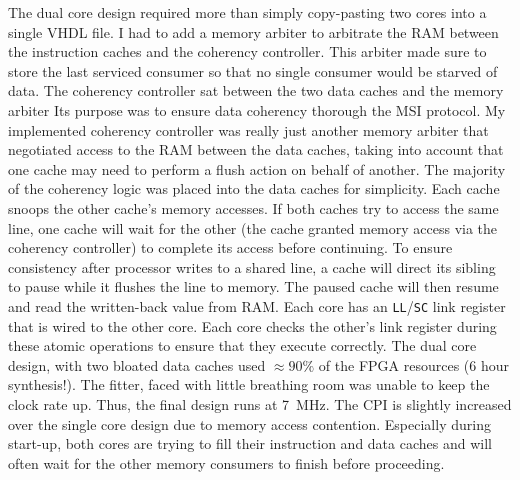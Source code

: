 \documentclass[12pt]{article}
\begin{document}
The dual core design required more than simply copy-pasting two cores into a single VHDL file. I had to add a memory arbiter to arbitrate the RAM between the instruction caches and the coherency controller. This arbiter made sure to store the last serviced consumer so that no single consumer would be starved of data. The coherency controller sat between the two data caches and the memory arbiter Its purpose was to ensure data coherency thorough the MSI protocol. My implemented coherency controller was really just another memory arbiter that negotiated access to the RAM between the data caches, taking into account that one cache may need to perform a flush action on behalf of another. The majority of the coherency logic was placed into the data caches for simplicity. Each cache snoops the other cache's memory accesses. If both caches try to access the same line, one cache will wait for the other (the cache granted memory access via the coherency controller) to complete its access before continuing. To ensure consistency after processor writes to a shared line, a cache will direct its sibling to pause while it flushes the line to memory. The paused cache will then resume and read the written-back value from RAM. Each core has an \texttt{LL}/\texttt{SC} link register that is wired to the other core. Each core checks the other's link register during these atomic operations to ensure that they execute correctly. The dual core design, with two bloated data caches used $\approx 90\%$ of the FPGA resources (6 hour synthesis!). The fitter, faced with little breathing room was unable to keep the clock rate up. Thus, the final design runs at 7~MHz. The CPI is slightly increased over the single core design due to memory access contention. Especially during start-up, both cores are trying to fill their instruction and data caches and will often wait for the other memory consumers to finish before proceeding.


\newpage
\end{document}
